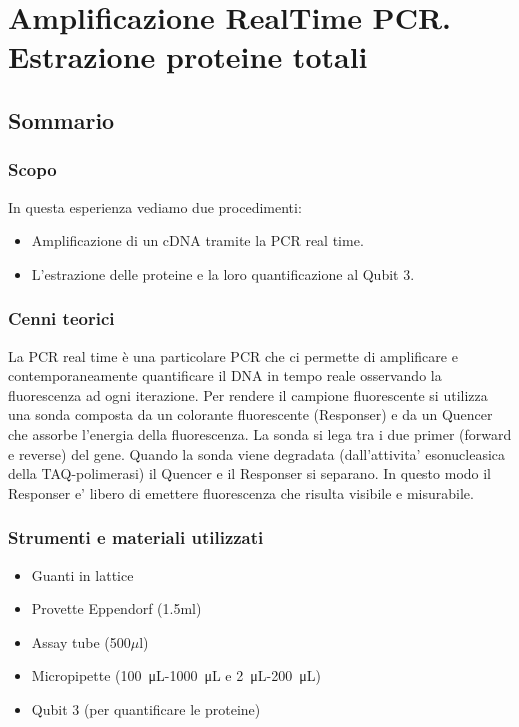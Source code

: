 \section{\LARGE{Amplificazione RealTime PCR. Estrazione proteine totali }}

\vspace{0.6cm}

\subsection{Sommario}

\subsubsection{Scopo}

In questa esperienza vediamo due procedimenti:
\begin{itemize}
  \item Amplificazione di un cDNA tramite la PCR real time.
  \item L'estrazione delle proteine e la loro quantificazione al Qubit 3.
\end{itemize}

\subsubsection{Cenni teorici}

La PCR real time è una particolare PCR che ci permette di amplificare e
contemporaneamente quantificare il DNA in tempo reale osservando la fluorescenza
ad ogni iterazione.
Per rendere il campione fluorescente si utilizza una sonda composta da un colorante
fluorescente (Responser) e da un Quencer che assorbe l'energia della fluorescenza.
La sonda si lega tra i due primer (forward e reverse) del gene.
Quando la sonda viene degradata (dall'attivita' esonucleasica della TAQ-polimerasi)
il Quencer e il Responser si separano. In questo modo il Responser e' libero di emettere
fluorescenza che risulta visibile e misurabile.

\subsubsection{Strumenti e materiali utilizzati}

\begin{itemize}
\item Guanti in lattice
\item Provette Eppendorf (1.5ml)
\item Assay tube (500$\mu$l)
\item Micropipette (\SI{100}{\micro\liter}-\SI{1000}{\micro\liter} e \SI{2}{\micro\liter}-\SI{200}{\micro\liter})
\item Qubit 3 (per quantificare le proteine)
\end{itemize}

